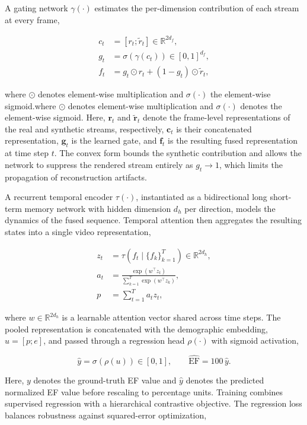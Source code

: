 \documentclass{ws-procs11x85}
\begin{document}
A gating network $\gamma(\cdot)$ estimates the per-dimension contribution of each stream at every frame,

\begin{align}
c_t &= [r_t; \tilde{r}_t] \in\mathbb{R}^{2d_f}, \\
g_t &= \sigma\!\left(\gamma(c_t)\right) \in [0,1]^{d_f}, \\
f_t &= g_t \odot r_t + (1-g_t)\odot \tilde{r}_t,
\end{align}

{\color{blue}where $\odot$ denotes element-wise multiplication and $\sigma(\cdot)$ the element-wise sigmoid.}{\color{red}where $\odot$ denotes element-wise multiplication and
$\sigma(\cdot)$ denotes the element-wise sigmoid. Here,
$\mathbf{r}_t$ and $\tilde{\mathbf{r}}_t$ denote the frame-level
representations of the real and synthetic streams, respectively,
$\mathbf{c}_t$ is their concatenated representation,
$\mathbf{g}_t$ is the learned gate, and $\mathbf{f}_t$ is the resulting
fused representation at time step $t$.} The convex form bounds the synthetic contribution and allows the network to suppress the rendered stream entirely as $g_t\rightarrow1$, which limits the propagation of reconstruction artifacts.~\cite{chen2021syntheticdata}

A recurrent temporal encoder $\tau(\cdot)$, instantiated as a bidirectional long short-term memory network with hidden dimension $d_h$ per direction, models the dynamics of the fused sequence.
Temporal attention then aggregates the resulting states into a single video representation,

\begin{align}
z_t &= \tau\!\left(f_t \mid \{f_k\}_{k=1}^{T}\right)\in\mathbb{R}^{2d_h}, \\
a_t &= \frac{\exp(w^\top z_t)}{\sum_{k=1}^{T}\exp(w^\top z_k)}, \\
p &= \sum_{t=1}^{T} a_t z_t,
\end{align}

where $w\in\mathbb{R}^{2d_h}$ is a learnable attention vector shared across time steps.
The pooled representation is concatenated with the demographic embedding, $u=[p;e]$, and passed through a regression head $\rho(\cdot)$ with sigmoid activation,

\begin{equation}
\hat{y} = \sigma\!\left(\rho(u)\right)\in[0,1],
\qquad
\widehat{\mathrm{EF}} = 100\,\hat{y}.
\end{equation}

{\color{red}Here, $y$ denotes the ground-truth EF value and $\hat{y}$ denotes the
predicted normalized EF value before rescaling to percentage units.} Training combines supervised regression with a hierarchical contrastive objective.
The regression loss balances robustness against squared-error optimization,
\end{document}

